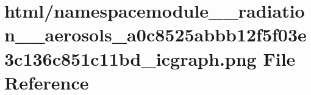 \hypertarget{namespacemodule____radiation____aerosols__a0c8525abbb12f5f03e3c136c851c11bd__icgraph_8png}{}\section{html/namespacemodule\+\_\+\+\_\+radiation\+\_\+\+\_\+aerosols\+\_\+a0c8525abbb12f5f03e3c136c851c11bd\+\_\+icgraph.png File Reference}
\label{namespacemodule____radiation____aerosols__a0c8525abbb12f5f03e3c136c851c11bd__icgraph_8png}
